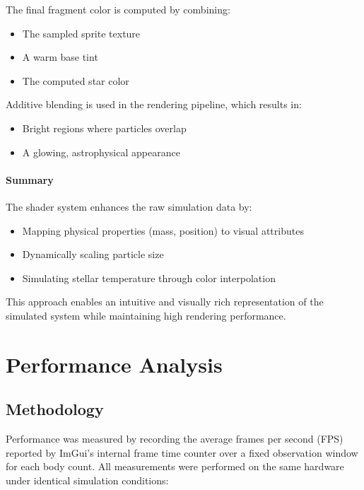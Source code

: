 \documentclass[12pt]{article}
\begin{document}
The final fragment color is computed by combining:
\begin{itemize}
\item The sampled sprite texture
\item A warm base tint
\item The computed star color
\end{itemize}

Additive blending is used in the rendering pipeline, which results in:
\begin{itemize}
\item Bright regions where particles overlap
\item A glowing, astrophysical appearance
\end{itemize}


\paragraph{Summary}

The shader system enhances the raw simulation data by:
\begin{itemize}
\item Mapping physical properties (mass, position) to visual attributes
\item Dynamically scaling particle size
\item Simulating stellar temperature through color interpolation
\end{itemize}

This approach enables an intuitive and visually rich representation of the simulated system while maintaining high rendering performance.


\section{Performance Analysis}

\subsection{Methodology}

Performance was measured by recording the average frames per second (FPS)
reported by ImGui's internal frame time counter over a fixed observation window
for each body count. All measurements were performed on the same hardware
under identical simulation conditions:
\end{document}
